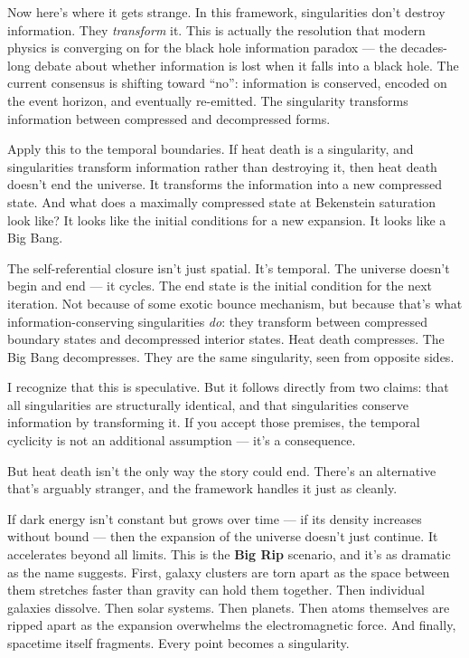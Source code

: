 \documentclass[11pt, twoside, openright]{book}
\begin{document}
Now here's where it gets strange. In this framework, singularities don't destroy information. They \textit{transform} it. This is actually the resolution that modern physics is converging on for the black hole information paradox --- the decades-long debate about whether information is lost when it falls into a black hole. The current consensus is shifting toward ``no'': information is conserved, encoded on the event horizon, and eventually re-emitted. The singularity transforms information between compressed and decompressed forms.

Apply this to the temporal boundaries. If heat death is a singularity, and singularities transform information rather than destroying it, then heat death doesn't end the universe. It transforms the information into a new compressed state. And what does a maximally compressed state at Bekenstein saturation look like? It looks like the initial conditions for a new expansion. It looks like a Big Bang.

The self-referential closure isn't just spatial. It's temporal. The universe doesn't begin and end --- it cycles. The end state is the initial condition for the next iteration. Not because of some exotic bounce mechanism, but because that's what information-conserving singularities \textit{do}: they transform between compressed boundary states and decompressed interior states. Heat death compresses. The Big Bang decompresses. They are the same singularity, seen from opposite sides.

I recognize that this is speculative. But it follows directly from two claims: that all singularities are structurally identical, and that singularities conserve information by transforming it. If you accept those premises, the temporal cyclicity is not an additional assumption --- it's a consequence.

But heat death isn't the only way the story could end. There's an alternative that's arguably stranger, and the framework handles it just as cleanly.

If dark energy isn't constant but grows over time --- if its density increases without bound --- then the expansion of the universe doesn't just continue. It accelerates beyond all limits. This is the \textbf{Big Rip} scenario, and it's as dramatic as the name suggests. First, galaxy clusters are torn apart as the space between them stretches faster than gravity can hold them together. Then individual galaxies dissolve. Then solar systems. Then planets. Then atoms themselves are ripped apart as the expansion overwhelms the electromagnetic force. And finally, spacetime itself fragments. Every point becomes a singularity.
\end{document}
